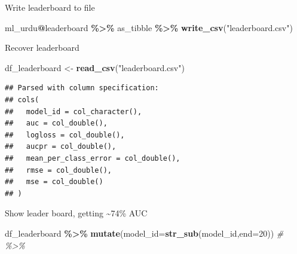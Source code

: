 \documentclass[
]{article}
\newenvironment{Shaded}{\begin{snugshade}}{\end{snugshade}}
\newcommand{\CommentTok}[1]{\textcolor[rgb]{0.56,0.35,0.01}{\textit{#1}}}
\newcommand{\DataTypeTok}[1]{\textcolor[rgb]{0.13,0.29,0.53}{#1}}
\newcommand{\DecValTok}[1]{\textcolor[rgb]{0.00,0.00,0.81}{#1}}
\newcommand{\KeywordTok}[1]{\textcolor[rgb]{0.13,0.29,0.53}{\textbf{#1}}}
\newcommand{\NormalTok}[1]{#1}
\newcommand{\OperatorTok}[1]{\textcolor[rgb]{0.81,0.36,0.00}{\textbf{#1}}}
\newcommand{\StringTok}[1]{\textcolor[rgb]{0.31,0.60,0.02}{#1}}
\begin{document}
Write leaderboard to file

\begin{Shaded}
\begin{Highlighting}[]
\NormalTok{ml\_urdu}\OperatorTok{@}\NormalTok{leaderboard }\OperatorTok{\%\textgreater{}\%}\StringTok{ }\NormalTok{as\_tibble }\OperatorTok{\%\textgreater{}\%}\StringTok{ }\KeywordTok{write\_csv}\NormalTok{(}\StringTok{"leaderboard.csv"}\NormalTok{)}
\end{Highlighting}
\end{Shaded}

Recover leaderboard

\begin{Shaded}
\begin{Highlighting}[]
\NormalTok{df\_leaderboard \textless{}{-}}\StringTok{ }\KeywordTok{read\_csv}\NormalTok{(}\StringTok{"leaderboard.csv"}\NormalTok{)}
\end{Highlighting}
\end{Shaded}

\begin{verbatim}
## Parsed with column specification:
## cols(
##   model_id = col_character(),
##   auc = col_double(),
##   logloss = col_double(),
##   aucpr = col_double(),
##   mean_per_class_error = col_double(),
##   rmse = col_double(),
##   mse = col_double()
## )
\end{verbatim}

Show leader board, getting \textasciitilde74\% AUC

\begin{Shaded}
\begin{Highlighting}[]
\NormalTok{df\_leaderboard }\OperatorTok{\%\textgreater{}\%}
\StringTok{  }\KeywordTok{mutate}\NormalTok{(}\DataTypeTok{model\_id=}\KeywordTok{str\_sub}\NormalTok{(model\_id,}\DataTypeTok{end=}\DecValTok{20}\NormalTok{)) }\CommentTok{\# \%\textgreater{}\%}
\end{Highlighting}
\end{Shaded}
\end{document}
